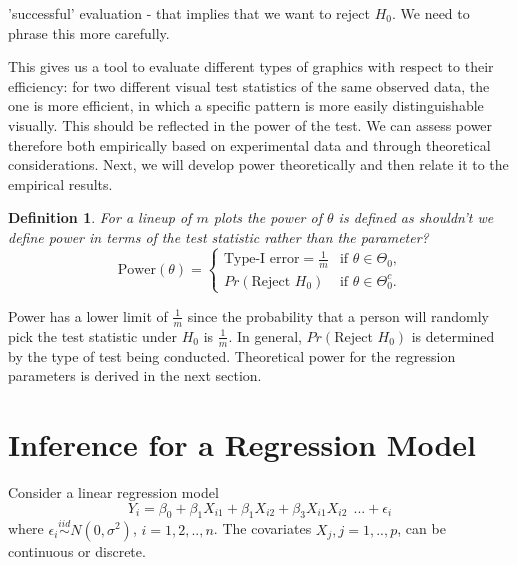 \documentclass{article}
\newcommand{\blue}[1]{{\color{blue} #1}}
\newtheorem{dfn}{Definition}[section]
\begin{document}
\blue{'successful' evaluation - that implies that we want to reject $H_0$. We need to phrase this more carefully. }

\blue{This gives us a tool to evaluate different types of graphics with respect to their efficiency:} for two different visual test statistics of the same observed data, the one  is \blue{more efficient}, in which a specific pattern is more easily distinguishable visually. This should be reflected in the power of the test. We can assess power therefore both empirically based on experimental data and through theoretical considerations. Next, we will develop power theoretically and then %
relate it to the empirical results.

\begin{dfn} \label{dfn:power}
For a lineup of $m$ plots the power of $\theta$ is defined as 
\blue{shouldn't we define power in terms of the test statistic rather than the parameter?}
    \begin{equation*}
      \text{Power}(\theta)= 
        \begin{cases} 
              \text{Type-I error}=\frac1m & \text{if $\theta \in \Theta_0$,} \\
              Pr(\text{Reject } H_0) &\text{if $\theta \in \Theta^c_0$.}
        \end{cases}
    \end{equation*}
\end{dfn}

Power has a lower limit of $\frac1m$ since the probability that a person will randomly pick the test statistic under $H_0$ is $\frac1m$. In general,  $Pr(\text{Reject } H_0)$ is determined by the type of test being conducted. Theoretical power for the regression parameters is derived in the next section.


\section{Inference for a Regression Model} \label{sec:regression}

Consider a linear regression model 
\begin{equation}\label{multi} Y_i = \beta_0 + \beta_1 X_{i1} + \beta_1 X_{i2} + \beta_3 X_{i1}X_{i2} ~~... + \epsilon_i 
\end{equation}
where $\epsilon_i \stackrel{iid}{ \sim } N(0,\sigma^2)$, $i=1,2, .., n$. The covariates $X_j, j=1,..,p$, can be continuous or discrete. 
\end{document}
